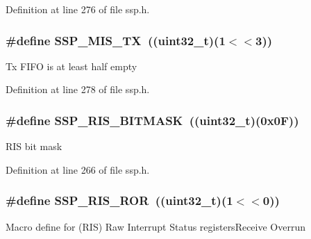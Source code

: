Definition at line 276 of file ssp.\+h.

\subsubsection[{\texorpdfstring{S\+S\+P\+\_\+\+M\+I\+S\+\_\+\+TX}{SSP_MIS_TX}}]{\setlength{\rightskip}{0pt plus 5cm}\#define S\+S\+P\+\_\+\+M\+I\+S\+\_\+\+TX~(({\bf uint32\+\_\+t})(1$<$$<$3))}\hypertarget{group___s_s_p___private___macros_ga1db3ebd72dfe222733297a3fb5ca37af}{}\label{group___s_s_p___private___macros_ga1db3ebd72dfe222733297a3fb5ca37af}
Tx F\+I\+FO is at least half empty 

Definition at line 278 of file ssp.\+h.

\subsubsection[{\texorpdfstring{S\+S\+P\+\_\+\+R\+I\+S\+\_\+\+B\+I\+T\+M\+A\+SK}{SSP_RIS_BITMASK}}]{\setlength{\rightskip}{0pt plus 5cm}\#define S\+S\+P\+\_\+\+R\+I\+S\+\_\+\+B\+I\+T\+M\+A\+SK~(({\bf uint32\+\_\+t})(0x0\+F))}\hypertarget{group___s_s_p___private___macros_gaaf0114701def5c9b0e291cdf29fab22d}{}\label{group___s_s_p___private___macros_gaaf0114701def5c9b0e291cdf29fab22d}
R\+IS bit mask 

Definition at line 266 of file ssp.\+h.

\subsubsection[{\texorpdfstring{S\+S\+P\+\_\+\+R\+I\+S\+\_\+\+R\+OR}{SSP_RIS_ROR}}]{\setlength{\rightskip}{0pt plus 5cm}\#define S\+S\+P\+\_\+\+R\+I\+S\+\_\+\+R\+OR~(({\bf uint32\+\_\+t})(1$<$$<$0))}\hypertarget{group___s_s_p___private___macros_ga0556e3aaa7aefef2c8ed76e1efbf277c}{}\label{group___s_s_p___private___macros_ga0556e3aaa7aefef2c8ed76e1efbf277c}
Macro define for (R\+IS) Raw Interrupt Status registers\+Receive Overrun 

